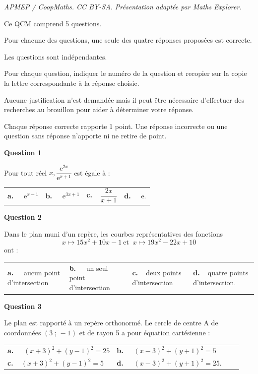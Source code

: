 \documentclass[10pt]{article}
\providecommand{\e}{{\mathrm{e}}}
\begin{document}
\noindent\textit{APMEP / CoopMaths. CC BY-SA. Présentation adaptée par Maths Explorer.}\par\medskip
\medskip

Ce QCM comprend 5 questions. 

Pour chacune des questions, une seule des quatre réponses proposées est correcte. 

Les questions sont indépendantes.

Pour chaque question, indiquer le numéro de la question et recopier sur la copie la lettre correspondante à la réponse choisie.

Aucune justification n'est demandée mais il peut être nécessaire d'effectuer des recherches au brouillon pour aider à déterminer votre réponse.

Chaque réponse correcte rapporte 1 point. Une réponse incorrecte ou une question sans réponse n'apporte ni ne retire de point.

\medskip
\textbf{Question 1}
\medskip 

Pour tout réel $x,\dfrac{\e^{2x}}{\e^{x+1}}$ est égale à :

\medskip 
\begin{tabularx}{\linewidth}{*{4}{X}}
\textbf{a.~~} $\e^{x-1} $ &\textbf{b.~~} $\e^{3x+1} $&\textbf{c.~~}$\dfrac{2x}{x+1} $& \textbf{d.~~} $ \e $.
\end{tabularx}

\medskip
\textbf{Question 2}
\medskip 

Dans le plan muni d'un repère, les courbes représentatives des fonctions
\[x \mapsto 15x^2 + 10x - 1 \ \text{et  }\ x\mapsto  19x^2 - 22x + 10\] ont :

\medskip 
\begin{tabularx}{\linewidth}{*{4}{X}}
\textbf{a.~~}  aucun point
d'intersection &\textbf{b.~~} un seul point d'intersection &\textbf{c.~~}deux points d'intersection& \textbf{d.~~}quatre points
d'intersection.

\end{tabularx}

\medskip
\textbf{Question 3}
\medskip 

Le plan est rapporté à un repère orthonormé. Le cercle de centre A de
coordonnées $(3~;~- 1)$ et de rayon 5 a pour équation cartésienne :

\medskip 
\begin{tabularx}{\linewidth}{*{4}{X}}
\textbf{a.~~} $(x + 3)^2 + ( y - 1)^2 = 25$&\textbf{b.~~} $( x - 3)^2 + ( y + 1)^2 = 5 $\\\textbf{c.~~}$(x + 3)^2 + ( y - 1)^2 = 5 $& \textbf{d.~~} $( x - 3)^2 + ( y + 1)^2 = 25  $.
\end{tabularx}
\end{document}
